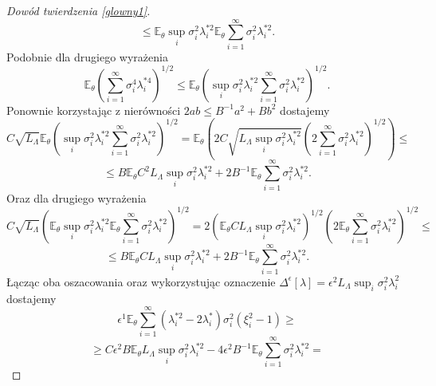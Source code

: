 \documentclass{article}
\begin{document}
\begin{proof}[Dowód twierdzenia \ref{glowny1}]
\begin{displaymath}
\end{displaymath}
\begin{displaymath}
\leq \mathbb{E}_{\theta}\sup_i\sigma_i^2\lambda_i^{*2}\mathbb{E}_{\theta}\sum_{i=1}^{\infty}\sigma_i^2\lambda_i^{*2}.
\end{displaymath}
Podobnie dla drugiego wyrażenia
\begin{displaymath}
\mathbb{E}_{\theta}\left(\sum_{i=1}^{\infty}\sigma_i^4\lambda_i^{*4}\right)^{1/2}\leq \mathbb{E}_{\theta}\left(\sup_i\sigma_i^2\lambda_i^{*2}\sum_{i=1}^{\infty}\sigma_i^2\lambda_i^{*2}\right)^{1/2}.
\end{displaymath}
Ponownie korzystając z nierówności $2ab\leq B^{-1}a^2+Bb^2$ dostajemy
\begin{displaymath}
C\sqrt{L_{\Lambda}}\mathbb{E}_{\theta}\left(\sup_i\sigma_i^2\lambda_i^{*2}\sum_{i=1}^{\infty}\sigma_i^2\lambda_i^{*2}\right)^{1/2}=\mathbb{E}_{\theta}\left(2C\sqrt{L_{\Lambda}\sup_i\sigma_i^2\lambda_i^{*2}}\left(2\sum_{i=1}^{\infty}\sigma_i^2\lambda_i^{*2}\right)^{1/2}\right)\leq
\end{displaymath}
\begin{displaymath}
\leq B\mathbb{E}_{\theta}C^2L_{\Lambda}\sup_i\sigma_i^2\lambda_i^{*2}+2B^{-1}\mathbb{E}_{\theta}\sum_{i=1}^{\infty}\sigma_i^2\lambda_i^{*2}.
\end{displaymath}
Oraz dla drugiego wyrażenia
\begin{displaymath}
C\sqrt{L_{\Lambda}}\left(\mathbb{E}_{\theta}\sup_i\sigma_i^2\lambda_i^{*2}\mathbb{E}_{\theta}\sum_{i=1}^{\infty}\sigma_i^2\lambda_i^{*2}\right)^{1/2}=2\left(\mathbb{E}_{\theta}CL_{\Lambda}\sup_i\sigma_i^2\lambda_i^{*2}\right)^{1/2}\left(2\mathbb{E}_{\theta}\sum_{i=1}^{\infty}\sigma_i^2\lambda_i^{*2}\right)^{1/2}\leq
\end{displaymath}
\begin{displaymath}
\leq B\mathbb{E}_{\theta}CL_{\Lambda}\sup_i\sigma_i^2\lambda_i^{*2}+2B^{-1}\mathbb{E}_{\theta}\sum_{i=1}^{\infty}\sigma_i^2\lambda_i^{*2}.
\end{displaymath}
Łącząc oba oszacowania oraz wykorzystując oznaczenie $\Delta^{\epsilon}[\lambda]=\epsilon^2L_{\Lambda}\sup_i\sigma_i^2\lambda_i^2$ dostajemy
\begin{displaymath}
\epsilon^1\mathbb{E}_{\theta}\sum_{i=1}^{\infty}(\lambda_i^{*2}-2\lambda_i^*)\sigma_i^2(\xi_i^2-1)\geq
\end{displaymath}
\begin{displaymath}
\geq C\epsilon^2 B\mathbb{E}_{\theta}L_{\Lambda}\sup_i\sigma_i^2\lambda_i^{*2}-4\epsilon^2B^{-1}\mathbb{E}_{\theta}\sum_{i=1}^{\infty}\sigma_i^2\lambda_i^{*2}=

\end{displaymath}
\end{proof}
\end{document}
